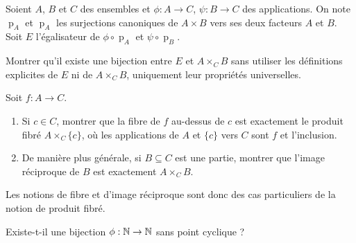 \begin{exercice}
Soient $A$, $B$ et $C$ des ensembles et $\phi : A\to C$, $\psi : B\to C$ des applications. On note $\operatorname{p}_A$ et $\operatorname{p}_A$ les surjections canoniques de $A\times B$ vers ses deux facteurs $A$ et $B$. Soit $E$ l'égalisateur de $\phi \circ \operatorname{p}_A$ et $\psi \circ \operatorname{p}_B$.

Montrer qu'il existe une bijection entre $E$ et $A\times_C B$ sans utiliser les définitions explicites de $E$ ni de $A\times_C B$, uniquement leur propriétés universelles.
\end{exercice}

\begin{exercice}
Soit $f : A\to C$.
\begin{enumerate}
\item Si $c\in C$, montrer que la fibre de $f$ au-dessus de $c$ est exactement le produit fibré $A\times_C \{c\}$, où les applications de $A$ et $\{c\}$ vers $C$ sont $f$ et l'inclusion.
\item De manière plus générale, si $B\subseteq C$ est une partie, montrer que l'image réciproque de $B$ est exactement $A\times_C B$.
\end{enumerate}
Les notions de fibre et d'image réciproque sont donc des cas particuliers de la notion de produit fibré.
\end{exercice}

\begin{exercice}
Existe-t-il une bijection $\phi : \mathbb{N}\to \mathbb{N}$ sans point cyclique ? %
\end{exercice}




